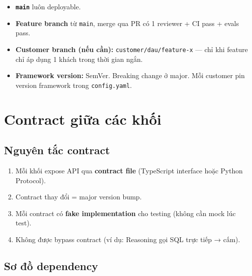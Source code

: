 \documentclass[11pt,a4paper]{article}
\begin{document}
\begin{itemize}
\item \textbf{\texttt{main}} luôn deployable.
\item \textbf{Feature branch} từ \texttt{main}, merge qua PR có 1 reviewer + CI pass + evals pass.
\item \textbf{Customer branch (nếu cần):} \texttt{customer/dau/feature-x} --- chỉ khi feature chỉ áp dụng 1 khách trong thời gian ngắn.
\item \textbf{Framework version:} SemVer. Breaking change ở major. Mỗi customer pin version framework trong \texttt{config.yaml}.
\end{itemize}

\clearpage

\section{Contract giữa các khối}

\subsection{Nguyên tắc contract}

\begin{enumerate}
\item Mỗi khối expose API qua \textbf{contract file} (TypeScript interface hoặc Python Protocol).
\item Contract thay đổi = major version bump.
\item Mỗi contract có \textbf{fake implementation} cho testing (không cần mock lúc test).
\item Không được bypass contract (ví dụ: Reasoning gọi SQL trực tiếp → cấm).
\end{enumerate}

\subsection{Sơ đồ dependency}
\end{document}
